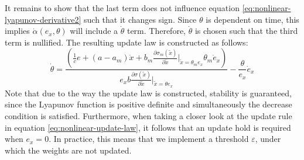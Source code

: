 It remains to show that the last term does not influence equation \eqref{eq:nonlinear-lyapunov-derivative2} such that it changes sign. Since $\theta$ is dependent on time, this implies $\dot \alpha(e_x, \theta)$ will include a $\dot \theta$ term. Therefore, $\dot \theta$ is chosen such that the third term is nullified. The resulting update law is constructed as follows:
\begin{equation}
    \dot \theta = \frac{(\frac{1}{c} e + (a-a_m)\dot x + b_m\frac{\partial \sigma_m(\tilde x)}{\partial \tilde x}\vert_{\tilde x=\theta_me_x}\theta_m \dot e_x) }{e_x b \frac{\partial \sigma(\tilde x)}{\partial \tilde x}\vert_{\tilde x=\theta e_x}} - \frac{\theta}{e_x}\dot e_x
   \label{eq:nonlinear-update-law}
\end{equation}
Note that due to the way the update law is constructed, stability is guaranteed, since the Lyapunov function is positive definite and simultaneously the decrease condition is satisfied. Furthermore, when taking a closer look at the update rule in equation \eqref{eq:nonlinear-update-law}, it follows that an update hold is required when $e_x=0$. In practice, this means that we implement a threshold $\varepsilon$, under which the weights are not updated.